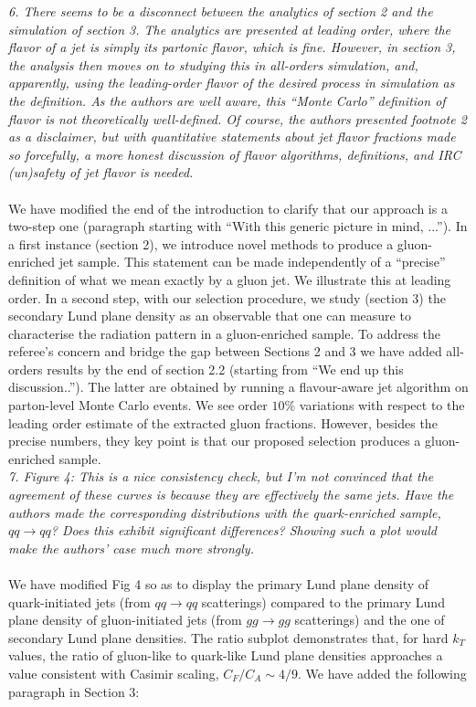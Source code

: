 \documentclass[a4paper,11pt]{article}
\begin{document}
\noindent\textit{6. There seems to be a disconnect between the analytics of section 2 and the simulation of section 3. The analytics are presented at leading order, where the flavor of a jet is simply its partonic flavor, which is fine. However, in section 3, the analysis then moves on to studying this in all-orders simulation, and, apparently, using the leading-order flavor of the desired process in simulation as the definition. As the authors are well aware, this “Monte Carlo” definition of flavor is not theoretically well-defined. Of course, the authors presented footnote 2 as a disclaimer, but with quantitative statements about jet flavor fractions made so forcefully, a more honest discussion of flavor algorithms, definitions, and IRC (un)safety of jet flavor is needed.}
\\
\\
We have modified the end of the introduction to clarify that our approach is a two-step one (paragraph starting with ``With this generic picture in mind, ...''). In a first instance (section 2), we introduce novel methods to produce a gluon-enriched jet sample. This statement can be made independently of a “precise” definition of what we mean exactly by a gluon jet. We illustrate this at leading order.  In a second step, with our selection procedure, we study (section 3) the secondary Lund plane density as an observable that one can measure to characterise the radiation pattern in a gluon-enriched sample. To address the referee’s concern and bridge the gap between Sections 2 and 3 we have added all-orders results by the end of section 2.2 (starting from ``We end up this discussion..''). The latter are obtained by running a flavour-aware jet algorithm on parton-level Monte Carlo events. We see order $10\%$ variations with respect to the leading order estimate of the extracted gluon fractions. However, besides the precise numbers, they key point is that our proposed selection produces a gluon-enriched sample.
\\

\noindent\textit{7. Figure 4: This is a nice consistency check, but I’m not convinced that the agreement of these curves is because they are effectively the same jets. Have the authors made the corresponding distributions with the quark-enriched sample, $qq\to qq$? Does this exhibit significant differences? Showing such a plot would make the authors’ case much more strongly.}
\\
\\
We have modified Fig 4 so as to display the primary Lund plane density of quark-initiated jets (from $qq\to qq$ scatterings) compared to the primary Lund plane density of gluon-initiated jets (from $gg\to gg$ scatterings) and the one of secondary Lund plane densities. The ratio subplot demonstrates that, for hard $k_T$ values, the ratio of gluon-like to quark-like Lund plane densities approaches a value consistent with Casimir scaling, $C_F/C_A \sim 4/9$. We have added the following paragraph in Section 3:
\\
\end{document}
